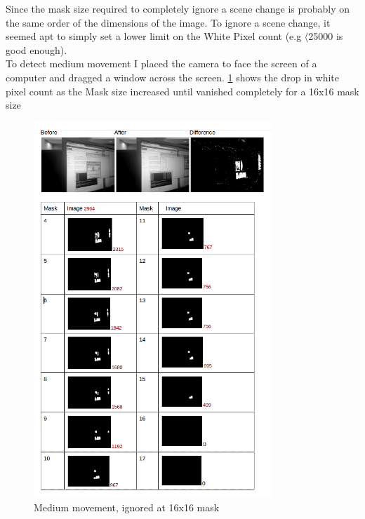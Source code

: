 \documentclass[11pt]{article} %
\begin{document}
Since the mask size required to completely ignore a scene change is probably on the same order of the dimensions of the image.  To ignore a scene change, it seemed apt to simply set a lower limit on the White Pixel count (e.g \(\langle\)25000 is good enough).
\\To detect medium movement I placed the camera to face the screen of a computer and dragged a window across the screen. \cref{img:medium} shows the drop in white pixel count as the Mask size increased until vanished completely for a 16x16 mask size
\begin{figure}[H]
	\vspace{-12pt}
	\begin{center}
		\includegraphics[width=0.8\textwidth]{../images/ImageOps/LARGE}
	\end{center}
	\vspace{-30pt}
	\caption{Medium movement, ignored at 16x16 mask}
	\label{img:medium}
	\vspace{-40pt}
\end{figure}
\end{document}
